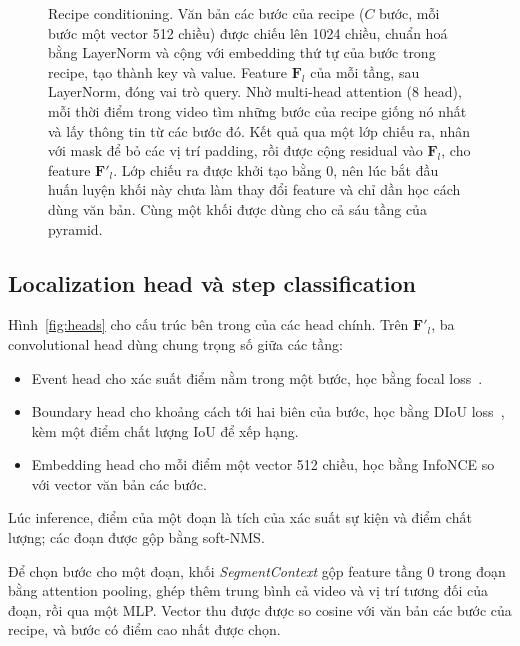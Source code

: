\documentclass{IEEEtran}
\begin{document}
\begin{figure}[t]
\centering
\resizebox{\columnwidth}{!}{}
\caption{Recipe conditioning. Văn bản các bước của recipe ($C$ bước, mỗi bước một vector 512 chiều) được chiếu lên 1024 chiều, chuẩn hoá bằng LayerNorm và cộng với embedding thứ tự của bước trong recipe, tạo thành key và value. Feature $\mathbf{F}_l$ của mỗi tầng, sau LayerNorm, đóng vai trò query. Nhờ multi-head attention (8 head), mỗi thời điểm trong video tìm những bước của recipe giống nó nhất và lấy thông tin từ các bước đó. Kết quả qua một lớp chiếu ra, nhân với mask để bỏ các vị trí padding, rồi được cộng residual vào $\mathbf{F}_l$, cho feature $\mathbf{F}'_l$. Lớp chiếu ra được khởi tạo bằng 0, nên lúc bắt đầu huấn luyện khối này chưa làm thay đổi feature và chỉ dần học cách dùng văn bản. Cùng một khối được dùng cho cả sáu tầng của pyramid.}
\label{fig:recipecond}
\end{figure}

\subsection{Localization head và step classification}
Hình~\ref{fig:heads} cho cấu trúc bên trong của các head chính. Trên $\mathbf{F}'_l$, ba convolutional head dùng chung trọng số giữa các tầng:
\begin{itemize}
\item Event head cho xác suất điểm nằm trong một bước, học bằng focal loss~\cite{focal}.
\item Boundary head cho khoảng cách tới hai biên của bước, học bằng DIoU loss~\cite{diou}, kèm một điểm chất lượng IoU để xếp hạng.
\item Embedding head cho mỗi điểm một vector 512 chiều, học bằng InfoNCE so với vector văn bản các bước.
\end{itemize}
Lúc inference, điểm của một đoạn là tích của xác suất sự kiện và điểm chất lượng; các đoạn được gộp bằng soft-NMS.

Để chọn bước cho một đoạn, khối \emph{SegmentContext} gộp feature tầng 0 trong đoạn bằng attention pooling, ghép thêm trung bình cả video và vị trí tương đối của đoạn, rồi qua một MLP. Vector thu được được so cosine với văn bản các bước của recipe, và bước có điểm cao nhất được chọn.
\end{document}

